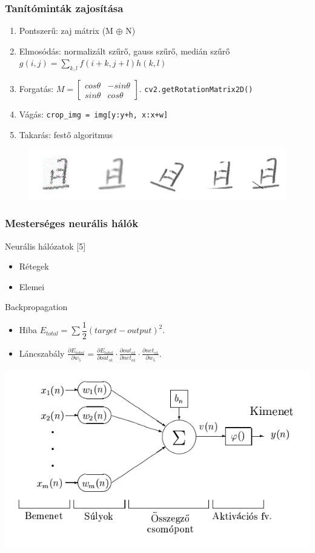 \documentclass{beamer}
\begin{document}
\begin{frame}[fragile]
\frametitle{Tanítóminták zajosítása}
\begin{enumerate}
\item Pontszerű: zaj mátrix (M $\oplus$ N)
\item Elmosódás: normalizált szűrő, gauss szűrő, medián szűrő $
g(i, j) = \sum_{k, l} f(i + k, j + l) h(k, l)
$
\item Forgatás: $
M = \begin{bmatrix} cos\theta & -sin\theta \\ sin\theta & cos\theta   \end{bmatrix}.
$
\texttt{cv2.getRotationMatrix2D()}
\item Vágás: \texttt{crop\_img = img[y:y+h, x:x+w]}
\item Takarás: festő algoritmus
\end{enumerate}
\begin{figure}[h]
\centering
\includegraphics[scale=0.5]{noises}
\end{figure}
\end{frame}

\begin{frame}[fragile]
\frametitle{Mesterséges neurális hálók}

Neurális hálózatok [5]
\begin{itemize}
\item Rétegek
\item Elemei
\end{itemize}

Backpropagation
\begin{itemize}
\item Hiba $E_{total} = \sum \dfrac{1}{2}(target - output)^2.$
\item Láncszabály $\frac{\partial E_{total}}{\partial w_{5}} = \frac{\partial E_{total}}{\partial out_{o1}} \cdot \frac{\partial out_{o1}}{\partial net_{o1}} \cdot \frac{\partial net_{o1}}{\partial w_{5}}.$
\end{itemize}

\includegraphics[scale=0.4, center]{ANNParts}

\end{frame}
\end{document}
